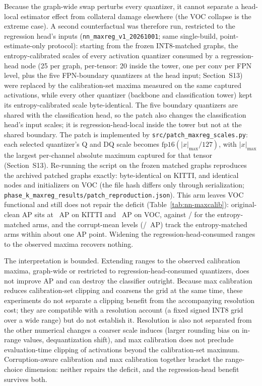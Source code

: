 \documentclass[10pt]{article}
\begin{document}
Because the graph-wide swap perturbs every quantizer, it cannot separate a
head-local estimator effect from collateral damage elsewhere (the VOC
collapse is the extreme case). A second counterfactual was therefore run,
restricted to the regression head's inputs (\texttt{nn\_maxreg\_v1\_20261001};
same single-build, point-estimate-only protocol): starting from the frozen
INT8-matched graphs, the entropy-calibrated scales of every activation
quantizer consumed by a regression-head node (25 per graph, per-tensor: 20
inside the tower, one per conv per FPN level, plus the five FPN-boundary
quantizers at the head input; Section~S13) were replaced by the
calibration-set maxima measured on the same captured activations, while
every other quantizer (backbone and classification tower) kept its
entropy-calibrated scale byte-identical. The five boundary quantizers are
shared with the classification head, so the patch also changes the
classification head's input scales; it is regression-head-local inside the
tower but not at the shared boundary. The patch is implemented by \texttt{src/patch\_maxreg\_scales.py}: each
selected quantizer's Q and DQ scale becomes
$\mathrm{fp16}(|x|_{\max}/127)$, with $|x|_{\max}$ the largest per-channel
absolute maximum captured for that tensor (Section~S13). Re-running the script
on the frozen matched graphs reproduces the archived patched graphs exactly:
byte-identical on KITTI, and identical nodes and initializers on VOC (the file
hash differs only through serialization;
\texttt{phase\_k\_maxreg\_results/patch\_reproduction.json}). This arm leaves VOC functional and still does not repair
the deficit (Table~\ref{tab:nn-maxcalib}): original-clean AP sits at
\nnMcMaxRegJKitti{}~AP on KITTI and \nnMcMaxRegJVoc{}~AP on VOC, against
\nnArmInCleanKitti{}/\nnArmInCleanVoc{} for the entropy-matched arms, and the
corrupt-mean levels (\nnMcMaxRegCKitti{}/\nnMcMaxRegCVoc{}~AP) track the
entropy-matched arms within about one AP point. Widening the
regression-head-consumed ranges to the observed maxima recovers nothing.

The interpretation is bounded. Extending ranges to the observed
calibration maxima, graph-wide or restricted to regression-head-consumed
quantizers, does not improve AP and can destroy the classifier outright.
Because max calibration reduces calibration-set clipping and coarsens the
grid at the same time, these experiments do not separate a clipping benefit
from the accompanying resolution cost; they are compatible with a
resolution account (a fixed signed INT8 grid over a wide range) but do not
establish it. Resolution is also not separated from the other numerical
changes a coarser scale induces (larger rounding bias on in-range values,
dequantization shift), and max calibration does not preclude
evaluation-time clipping of activations beyond the calibration-set maximum.
Corruption-aware calibration and max calibration together bracket the
range-choice dimension: neither repairs the deficit, and the
regression-head benefit survives both.
\end{document}
